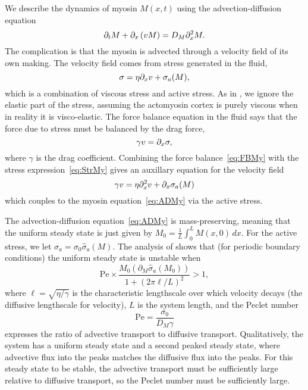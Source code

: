 \documentclass[11pt]{article}
\newcommand{\6}[1]{#1_{\text{6}}}
\newcommand{\3}[1]{#1_{\text{3}}}
\begin{document}
We describe the dynamics of myosin $M(x,t)$ using the advection-diffusion equation
\begin{equation}
\label{eq:ADMy}
\partial_t M + \partial_x \left(v M\right) = D_M \partial_x^2 M.
\end{equation}
The complication is that the myosin is advected through a velocity field of its own making. The velocity field comes from stress generated in the fluid, 
\begin{equation}
\label{eq:StrMy}
\sigma = \eta \partial_x{v} + \sigma_a(M),
\end{equation}
which is a combination of viscous stress and active stress. As in \cite{bois2011pattern}, we ignore the elastic part of the stress, assuming the actomyosin cortex is purely viscous when in reality it is visco-elastic. The force balance equation in the fluid says that the force due to stress must be balanced by the drag force, 
\begin{equation}
\label{eq:FBMy}
\gamma v = \partial_x \sigma,
\end{equation}
where $\gamma$ is the drag coefficient. Combining the force balance\ \eqref{eq:FBMy} with the stress expression\ \eqref{eq:StrMy} gives an auxillary equation for the velocity field
\begin{equation}
\gamma v = \eta \partial_x^2 v + \partial_x \sigma_a(M)
\end{equation}
which couples to the myosin equation\ \eqref{eq:ADMy} via the active stress.

The advection-diffusion equation\ \eqref{eq:ADMy} is mass-preserving, meaning that the uniform steady state is just given by $\displaystyle{M_0 = \frac{1}{L}\int_0^L M(x,0) \, dx}$. For the active stress, we let $\sigma_a=\sigma_0 \hat \sigma_a(M)$. The analysis of \cite{bois2011pattern} shows that (for periodic boundary conditions) the uniform steady state is unstable when  
\begin{equation}
\label{eq:StabBD}
\text{Pe}  \times \frac{M_0 \left(\partial_M \hat \sigma_a \left(M_0\right)\right)}{1+\left(2\pi \ell/L\right)^2} > 1,
\end{equation}
where $\ell=\sqrt{\eta/\gamma}$ is the characteristic lengthscale over which velocity decays (the diffusive lengthscale for velocity), $L$ is the system length, and the Peclet number
\begin{equation}
\text{Pe} = \frac{\sigma_0}{D_M \gamma}
\end{equation}
expresses the ratio of advective transport to diffusive transport. Qualitatively, the system has a uniform steady state and a second peaked steady state, where advective flux into the peaks matches the diffusive flux into the peaks. For this steady state to be stable, the advective transport must be sufficiently large relative to diffusive transport, so the Peclet number must be sufficiently large.
\end{document}
